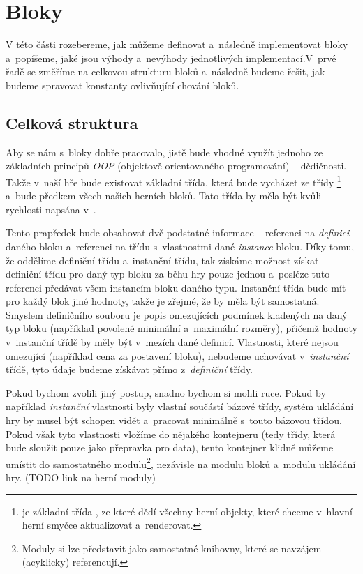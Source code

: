 
\section{Bloky}

V této části rozebereme, jak můžeme definovat a~následně implementovat bloky a~popíšeme, jaké jsou výhody a~nevýhody jednotlivých implementací.\linebreak V~prvé řadě se změříme na celkovou strukturu bloků a~následně budeme řešit, jak budeme spravovat konstanty ovlivňující chování bloků.

\subsection{Celková struktura}

Aby se nám s~bloky dobře pracovalo, jistě bude vhodné využít jednoho ze základních principů \textit{OOP} (objektově orientovaného programování) -- dědičnosti. Takže v~naší hře bude existovat základní třída, která bude vycházet ze třídy \footnote{ je základní třída \UEu{}, ze které dědí všechny herní objekty, které chceme v~hlavní herní smyčce aktualizovat a~renderovat.} a~bude předkem všech našich herních bloků. Tato třída by měla být kvůli rychlosti napsána v~\CPP{}.

Tento prapředek bude obsahovat dvě podstatné informace -- referenci na \textit{definici} daného bloku a~referenci na třídu s~vlastnostmi dané \textit{instance} bloku. Díky tomu, že oddělíme definiční třídu a~instanční třídu, tak získáme možnost získat definiční třídu pro daný typ bloku za běhu hry pouze jednou a~posléze tuto referenci předávat všem instancím bloku daného typu. Instanční třída bude mít pro každý blok jiné hodnoty, takže je zřejmé, že by měla být samostatná. Smyslem definičního souboru je popis omezujících podmínek kladených na daný typ bloku (například povolené minimální a~maximální rozměry), přičemž hodnoty v~instanční třídě by měly být v~mezích dané definicí. Vlastnosti, které nejsou omezující (například cena za postavení bloku), nebudeme uchovávat v~\textit{instanční} třídě, tyto údaje budeme získávat přímo z~\textit{definiční} třídy.

Pokud bychom zvolili jiný postup, snadno bychom si mohli  ruce. Pokud by například \textit{instanční} vlastnosti byly vlastní součástí bázové třídy, systém ukládání hry by musel být schopen vidět a~pracovat minimálně s~touto bázovou třídou. Pokud však tyto vlastnosti vložíme do nějakého kontejneru (tedy třídy, která bude sloužit pouze jako přepravka pro data), tento kontejner klidně můžeme umístit do samostatného modulu\footnote{Moduly si lze představit jako samostatné knihovny, které se navzájem (acyklicky) referencují.}, nezávisle na modulu bloků a~modulu ukládání hry.  (TODO link na herní moduly)

